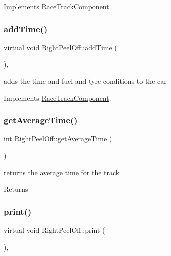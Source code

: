 Implements \mbox{\hyperlink{class_race_track_component_af89a6b453dfd3fb39fce27576012106f}{Race\+Track\+Component}}.

\mbox{\label{class_right_peel_off_aa3097a53c5cf4b01495913cad798c1d4}} 
\subsubsection{\texorpdfstring{add\+Time()}{addTime()}}
{\footnotesize\ttfamily virtual void Right\+Peel\+Off\+::add\+Time (\begin{DoxyParamCaption}{ }\end{DoxyParamCaption})\hspace{0.3cm}{\ttfamily [inline]}, {\ttfamily [virtual]}}

adds the time and fuel and tyre conditions to the car 

Implements \mbox{\hyperlink{class_race_track_component_aa815404c45ba7df3786c3add177eb7e6}{Race\+Track\+Component}}.

\mbox{\label{class_right_peel_off_ae18a40aabf89576be0fd9bf244c7c72f}} 
\subsubsection{\texorpdfstring{get\+Average\+Time()}{getAverageTime()}}
{\footnotesize\ttfamily int Right\+Peel\+Off\+::get\+Average\+Time (\begin{DoxyParamCaption}{ }\end{DoxyParamCaption})\hspace{0.3cm}{\ttfamily [inline]}}

returns the average time for the track \begin{DoxyReturn}{Returns}

\end{DoxyReturn}
\mbox{\label{class_right_peel_off_a097f627c43aedcc60c89d2760a67c233}} 
\subsubsection{\texorpdfstring{print()}{print()}}
{\footnotesize\ttfamily virtual void Right\+Peel\+Off\+::print (\begin{DoxyParamCaption}{ }\end{DoxyParamCaption})\hspace{0.3cm}{\ttfamily [inline]}, {\ttfamily [virtual]}}


